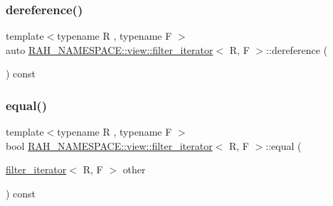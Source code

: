 \mbox{\label{struct_r_a_h___n_a_m_e_s_p_a_c_e_1_1view_1_1filter__iterator_a12c400545fa208b97848e2036cf719ee}} 
\subsubsection{\texorpdfstring{dereference()}{dereference()}}
{\footnotesize\ttfamily template$<$typename R , typename F $>$ \\
auto \mbox{\hyperlink{struct_r_a_h___n_a_m_e_s_p_a_c_e_1_1view_1_1filter__iterator}{R\+A\+H\+\_\+\+N\+A\+M\+E\+S\+P\+A\+C\+E\+::view\+::filter\+\_\+iterator}}$<$ R, F $>$\+::dereference (\begin{DoxyParamCaption}{ }\end{DoxyParamCaption}) const\hspace{0.3cm}{\ttfamily [inline]}}

\mbox{\label{struct_r_a_h___n_a_m_e_s_p_a_c_e_1_1view_1_1filter__iterator_a22b7c003a179251a82020adf3581fb41}} 
\subsubsection{\texorpdfstring{equal()}{equal()}}
{\footnotesize\ttfamily template$<$typename R , typename F $>$ \\
bool \mbox{\hyperlink{struct_r_a_h___n_a_m_e_s_p_a_c_e_1_1view_1_1filter__iterator}{R\+A\+H\+\_\+\+N\+A\+M\+E\+S\+P\+A\+C\+E\+::view\+::filter\+\_\+iterator}}$<$ R, F $>$\+::equal (\begin{DoxyParamCaption}\item[{\mbox{\hyperlink{struct_r_a_h___n_a_m_e_s_p_a_c_e_1_1view_1_1filter__iterator}{filter\+\_\+iterator}}$<$ R, F $>$}]{other }\end{DoxyParamCaption}) const\hspace{0.3cm}{\ttfamily [inline]}}

